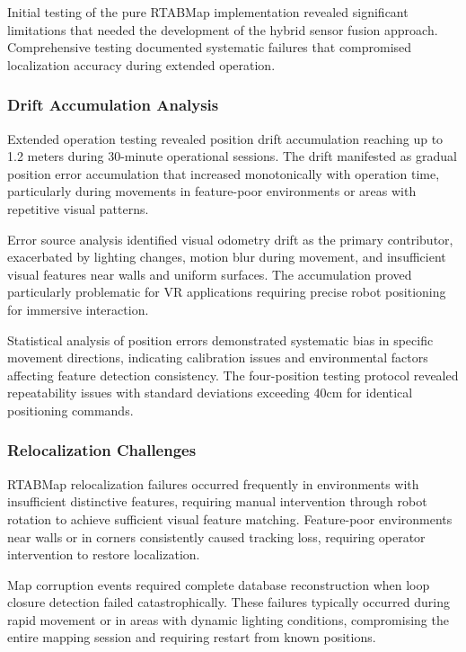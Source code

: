 Initial testing of the pure RTABMap implementation revealed significant limitations that needed the development of the hybrid sensor fusion approach. Comprehensive testing documented systematic failures that compromised localization accuracy during extended operation.

\subsubsection{Drift Accumulation Analysis}

Extended operation testing revealed position drift accumulation reaching up to 1.2 meters during 30-minute operational sessions. The drift manifested as gradual position error accumulation that increased monotonically with operation time, particularly during movements in feature-poor environments or areas with repetitive visual patterns.

Error source analysis identified visual odometry drift as the primary contributor, exacerbated by lighting changes, motion blur during movement, and insufficient visual features near walls and uniform surfaces. The accumulation proved particularly problematic for VR applications requiring precise robot positioning for immersive interaction.

Statistical analysis of position errors demonstrated systematic bias in specific movement directions, indicating calibration issues and environmental factors affecting feature detection consistency. The four-position testing protocol revealed repeatability issues with standard deviations exceeding 40cm for identical positioning commands.

\subsubsection{Relocalization Challenges}

RTABMap relocalization failures occurred frequently in environments with insufficient distinctive features, requiring manual intervention through robot rotation to achieve sufficient visual feature matching. Feature-poor environments near walls or in corners consistently caused tracking loss, requiring operator intervention to restore localization.

Map corruption events required complete database reconstruction when loop closure detection failed catastrophically. These failures typically occurred during rapid movement or in areas with dynamic lighting conditions, compromising the entire mapping session and requiring restart from known positions.

